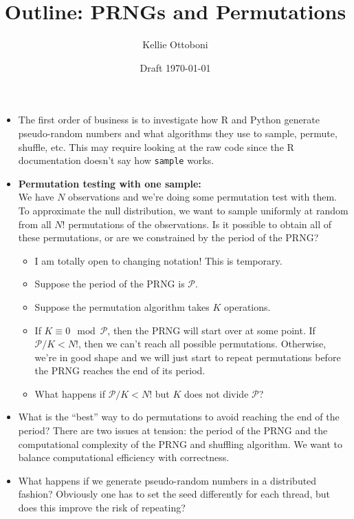 \documentclass[12pt]{article}
\title{Outline: PRNGs and Permutations}
\author{Kellie Ottoboni}
\date{Draft \today}
\begin{document}
\maketitle






\begin{itemize}
\item The first order of business is to investigate how R and Python generate pseudo-random numbers and
what algorithms they use to sample, permute, shuffle, etc.
This may require looking at the raw code since the R documentation doesn't say how \texttt{sample} works.
\item \textbf{Permutation testing with one sample:} \\
We have $N$ observations and we're doing some permutation test with them.
To approximate the null distribution, we want to sample uniformly at random from all $N!$ permutations of the observations.
Is it possible to obtain all of these permutations, or are we constrained by the period of the PRNG?
\begin{itemize}
\item I am totally open to changing notation! This is temporary.
\item Suppose the period of the PRNG is $\mathcal{P}$.
\item Suppose the permutation algorithm takes $K$ operations.
\item If $K \equiv 0 \mod \mathcal{P}$, then the PRNG will start over at some point. If $\mathcal{P}/K < N!$, then we can't reach all possible permutations.
Otherwise, we're in good shape and we will just start to repeat permutations before the PRNG reaches the end of its period.
\item What happens if $\mathcal{P}/K < N!$ but $K$ does not divide $\mathcal{P}$?
\end{itemize}
\item What is the ``best'' way to do permutations to avoid reaching the end of the period?
There are two issues at tension: the period of the PRNG and the computational complexity of the PRNG and shuffling algorithm.
We want to balance computational efficiency with correctness.
\item What happens if we generate pseudo-random numbers in a distributed fashion?
Obviously one has to set the seed differently for each thread, but does this improve the risk of repeating?
\end{itemize}



\end{document}
